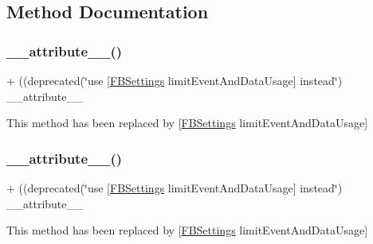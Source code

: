 \subsection{Method Documentation}
\mbox{\label{interfaceFBAppEvents_a395c574fef6bbde5ac4b98b6cf497b8c}} 
\subsubsection{\texorpdfstring{\+\_\+\+\_\+attribute\+\_\+\+\_\+()}{\_\_attribute\_\_()}\hspace{0.1cm}{\footnotesize\ttfamily [1/5]}}
{\footnotesize\ttfamily + ((deprecated(\char`\"{}use \mbox{[}\hyperlink{interfaceFBSettings}{F\+B\+Settings} limit\+Event\+And\+Data\+Usage\mbox{]} instead\char`\"{}) \+\_\+\+\_\+attribute\+\_\+\+\_\+ \begin{DoxyParamCaption}{ }\end{DoxyParamCaption}}

This method has been replaced by \mbox{[}\hyperlink{interfaceFBSettings}{F\+B\+Settings} limit\+Event\+And\+Data\+Usage\mbox{]} \mbox{\label{interfaceFBAppEvents_a395c574fef6bbde5ac4b98b6cf497b8c}} 
\subsubsection{\texorpdfstring{\+\_\+\+\_\+attribute\+\_\+\+\_\+()}{\_\_attribute\_\_()}\hspace{0.1cm}{\footnotesize\ttfamily [2/5]}}
{\footnotesize\ttfamily + ((deprecated(\char`\"{}use \mbox{[}\hyperlink{interfaceFBSettings}{F\+B\+Settings} limit\+Event\+And\+Data\+Usage\mbox{]} instead\char`\"{}) \+\_\+\+\_\+attribute\+\_\+\+\_\+ \begin{DoxyParamCaption}{ }\end{DoxyParamCaption}}

This method has been replaced by \mbox{[}\hyperlink{interfaceFBSettings}{F\+B\+Settings} limit\+Event\+And\+Data\+Usage\mbox{]} \mbox{\label{interfaceFBAppEvents_a395c574fef6bbde5ac4b98b6cf497b8c}} 
